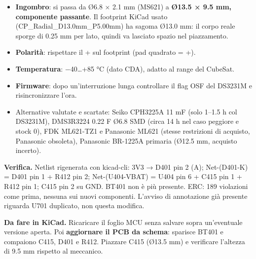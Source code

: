 \begin{itemize}
\item \textbf{Ingombro}: si passa da Ø6.8 × 2.1 mm (MS621) a \textbf{Ø13.5 × 9.5 mm, componente passante}. Il footprint KiCad usato (CP\_\allowbreak{}Radial\_\allowbreak{}D13.0mm\_\allowbreak{}P5.00mm) ha sagoma Ø13.0 mm: il corpo reale sporge di 0.25 mm per lato, quindi va lasciato spazio nel piazzamento.
\item \textbf{Polarità}: rispettare il + sul footprint (pad quadrato = +).
\item \textbf{Temperatura}: −40…+85 °C (dato CDA), adatto al range del CubeSat.
\item \textbf{Firmware}: dopo un'interruzione lunga controllare il flag OSF del DS3231M e risincronizzare l'ora.
\item Alternative valutate e scartate: Seiko CPH3225A 11 mF (solo 1–1.5 h col DS3231M), DMS3R3224 0.22 F Ø6.8 SMD (circa 14 h nel caso peggiore e stock 0), FDK ML621-TZ1 e Panasonic ML621 (stesse restrizioni di acquisto, Panasonic obsoleta), Panasonic BR-1225A primaria (Ø12.5 mm, acquisto incerto).
\end{itemize}

\textbf{Verifica.} Netlist rigenerata con kicad-cli: 3V3 → D401 pin 2 (A); Net-(D401-K) = D401 pin 1 + R412 pin 2; Net-(U404-VBAT) = U404 pin 6 + C415 pin 1 + R412 pin 1; C415 pin 2 su GND. BT401 non è più presente. ERC: 189 violazioni come prima, nessuna sui nuovi componenti. L'avviso di annotazione già presente riguarda U701 duplicato, non questa modifica.

\begin{notebox}
\textbf{Da fare in KiCad.} Ricaricare il foglio MCU senza salvare sopra un'eventuale versione aperta. Poi \textbf{aggiornare il PCB da schema}: sparisce BT401 e compaiono C415, D401 e R412. Piazzare C415 (Ø13.5 mm) e verificare l'altezza di 9.5 mm rispetto al meccanico.
\end{notebox}
